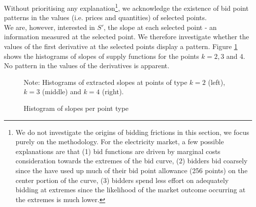 Without prioritising any explanation\footnote{ We do not investigate the origins of bidding frictions in this section, we focus purely on  the methodology. For the electricity market, a few possible explanations are that (1) bid functions are driven by marginal costs consideration towards the extremes of the bid curve, (2) bidders bid coarsely since the have used up much of their bid point allowance (256 points) on the center portion of the curve, (3) bidders spend less effort on adequately bidding at extremes since the likelihood of the market outcome occurring at the extremes is much lower. }, we acknowledge the existence of bid point patterns in the values (i.e. prices and quantities) of selected points. \\

We are, however, interested in $S'$, the slope at each selected point - an information measured at the selected point. We therefore investigate whether the values of the first derivative at the selected points display a pattern. Figure \ref{histpattern1} shows the histograms of slopes of supply functions for the points $k=2,3$ and 4. No pattern in the values of the derivatives is apparent. \\

\begin{figure}[!ht]
\begin{center}
\caption{Histogram of slopes per point type}
\label{histpattern1}
\end{center}
{ \small Note: Histograms of extracted slopes at points of type $k=2$ (left), $k=3$ (middle) and $k=4$ (right).} 
\end{figure}


